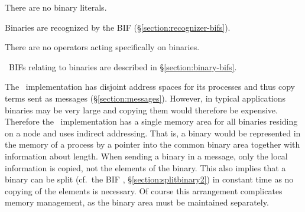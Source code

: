 \iffalse
It's \emph{raison d'\^{e}tre} is communication between processes,
where low-level communication takes place through sequences of bytes
and terms are to be communicated.  There are thus BIFs for translating
from arbitrary terms to binaries and vice versa.  An arbitrary term
$t$ can be sent from a process $p$ to a process $q$ as follows:
\begin{enumerate}
\item process $p$ obtains the binary $b$ representing $t$;
\item the binary $b$ is sent via a port connecting $p$ and $q$;
\item process $q$ retrieves the original term $t$ from $b$.
\end{enumerate}
The internal representation of terms may allow \emph{sharing} of
structure between identical subterms.  If so, sharing in $p$'s
representation of $t$ and sharing in $q$'s representation of $t$ are
totally independent of each other and so are the memory requirements
for representing $t$ in $p$ and in $q$.
\fi

There are no binary literals.

Binaries are recognized by the BIF
\ifStd{}\else{}\fi
(\S\ref{section:recognizer-bifs}).

There are no operators acting specifically on binaries.

\Erlang\ BIFs relating to binaries are described in
\S\ref{section:binary-bifs}.

\ifOld
\NOTE

The \OldErlang\ implementation has disjoint address spaces for its
processes and thus copy terms sent as messages
(\S\ref{section:messages}).  However, in typical applications binaries
may be very large and copying them would therefore be expensive.
Therefore the \OldErlang\ implementation has a single memory area for
all binaries residing on a node and uses indirect addressing.  That
is, a binary would be represented in the memory of a process by a
pointer into the common binary area together with information about
length.  When sending a binary in a message, only the local
information is copied, not the elements of the binary.  This also
implies that a binary can be split (cf.~the BIF ,
\S\ref{section:splitbinary2}) in constant time as no copying of the
elements is necessary.  Of course this arrangement complicates memory
management, as the binary area must be
maintained separately.
\fi
{}

